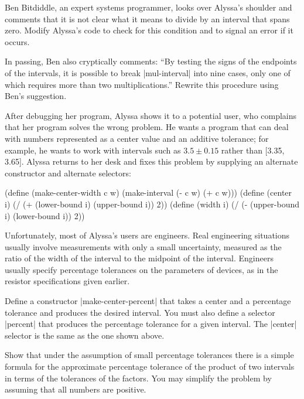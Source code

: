 \begin{Exercise}
\begin{Exercise}
\label{exc:2.10}
Ben Bitdiddle, an expert systems programmer, looks over Alyssa's
shoulder and comments that it is not clear what it means to
divide by an interval that spans zero.  Modify Alyssa's code to
check for this condition and to signal an error if it occurs.
\end{Exercise}

\begin{Exercise}
\label{exc:2.11}
In passing, Ben also cryptically comments: ``By testing the signs of
the endpoints of the intervals, it is possible to break \scheme|mul-interval| into nine cases, only one of which requires more than
two multiplications.''  Rewrite this procedure using Ben's
suggestion.

After debugging her program, Alyssa shows it to a potential user,
who complains that her program solves the wrong problem.  He
wants a program that can deal with numbers represented as a center
value and an additive tolerance; for example, he wants to work with
intervals such as $3.5 \pm 0.15$ rather than [3.35, 3.65].  Alyssa 
returns to her desk and fixes this problem by supplying an alternate
constructor and alternate selectors:

\begin{schemedisplay}
(define (make-center-width c w)
  (make-interval (- c w) (+ c w)))
(define (center i)
  (/ (+ (lower-bound i) (upper-bound i)) 2))
(define (width i)
  (/ (- (upper-bound i) (lower-bound i)) 2))
\end{schemedisplay}

Unfortunately, most of Alyssa's users are engineers.  Real engineering
situations usually involve measurements with only a small uncertainty,
measured as the ratio of the width of the interval to the midpoint of
the interval.  Engineers usually specify percentage tolerances on the
parameters of devices, as in the resistor specifications given
earlier.
\end{Exercise}

\begin{Exercise}
\label{exc:2.12}
Define a constructor \scheme|make-center-percent| that takes a center and
a percentage tolerance and produces the desired interval.  You must
also define a selector \scheme|percent| that produces the
percentage tolerance for a given interval.  The \scheme|center| selector
is the same as the one shown above.
\end{Exercise}

\begin{Exercise}
\label{exc:2.13}
Show that under the assumption of small percentage tolerances there is
a simple formula for the approximate percentage tolerance of the
product of two intervals in terms of the tolerances of the factors.
You may simplify the problem by assuming that all numbers are
positive.
\end{Exercise}


\end{Exercise}
